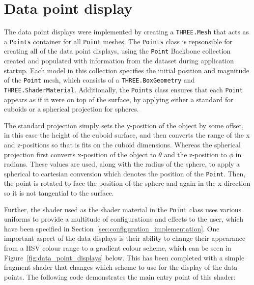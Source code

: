\section{Data point display} {
\label{sec:data_point_display}

	The data point displays were implemented by creating a \texttt{THREE.Mesh} that acts as a \texttt{Points} container for all \texttt{Point} meshes. The \texttt{Points} class is repsonsible for creating all of the data point displays, using the \texttt{Point} Backbone collection created and populated with information from the dataset during application startup. Each model in this collection specifies the initial position and magnitude of the \texttt{Point} mesh, which consists of a \texttt{THREE.BoxGeometry} and \texttt{THREE.ShaderMaterial}. Additionally, the \texttt{Points} class ensures that each \texttt{Point} appears as if it were on top of the surface, by applying either a standard for cuboids or a spherical projection for spheres.

	The standard projection simply sets the y-position of the object by some offset, in this case the height of the cuboid surface, and then converts the range of the x and z-positions so that is fits on the cuboid dimensions. Whereas the spherical projection first converts x-position of the object to $\theta$ and the z-position to $\phi$ in radians. These values are used, along with the radius of the sphere, to apply a spherical to cartesian conversion which denotes the position of the \texttt{Point}. Then, the point is rotated to face the position of the sphere and again in the x-direction so it is not tangential to the surface.

	Further, the shader used as the shader material in the \texttt{Point} class uses various uniforms to provide a multitude of configurations and effects to the user, which have been specified in Section~\ref{sec:configuration_implementation}. One important aspect of the data displays is their ability to change their appearance from a HSV colour range to a gradient colour scheme, which can be seen in Figure~\ref{fig:data_point_displays} below. This has been completed with a simple fragment shader that changes which scheme to use for the display of the data points. The following code demonstrates the main entry point of this shader:

	

	

}

